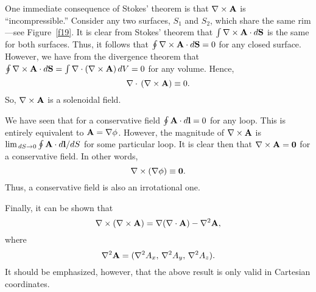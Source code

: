 One immediate consequence of  Stokes' theorem is that $\nabla\times{\bf A}$
is ``incompressible.''  Consider any two surfaces, $S_1$ and $S_2$, which share the
same rim---see Figure~\ref{f19}. It is clear from Stokes' theorem that 
$\int \nabla\times {\bf A}\cdot d{\bf S}$ is the same for both surfaces. Thus, it
follows that $\oint\nabla\times {\bf A}\cdot d{\bf S} = 0$ for any closed surface.
However, we have from the divergence theorem that
$\oint\nabla\times{\bf A}\cdot d{\bf S} = \int \nabla\cdot(\nabla\times{\bf A}) \,dV
=0$
 for any volume. Hence,
\begin{equation}
\nabla\cdot\,(\nabla\times{\bf A}) \equiv 0.
\end{equation}
So,
$\nabla\times {\bf A}$ is a solenoidal field. 

We have seen that for a conservative field $\oint {\bf A}\cdot d{\bf l} = 0$
for any loop. This  is entirely equivalent to ${\bf A} = \nabla\phi$. 
However, the magnitude of $\nabla\times{\bf A}$ is 
$\lim_{\,dS\rightarrow 0}\oint{\bf A}\cdot d{\bf l} /dS$ for some
particular loop. It is clear then that
$\nabla\times{\bf A}={\bf 0}$ for a conservative field. In other words,
\begin{equation}
\nabla\times(\nabla\phi)\equiv {\bf 0}.
\end{equation}
Thus, a conservative field is also an irrotational one. 

Finally, it can be shown that
\begin{equation}
\nabla\times(\nabla\times{\bf A} ) = \nabla(\nabla\cdot{\bf A})
- \nabla^2 {\bf A},
\end{equation}
where 
\begin{equation}
\nabla^2{\bf A} = (\nabla^2 A_x,\, \nabla^2 A_y,\, \nabla^2 A_z).
\end{equation}
It should be emphasized, however, that the above result is only valid in
Cartesian coordinates.

